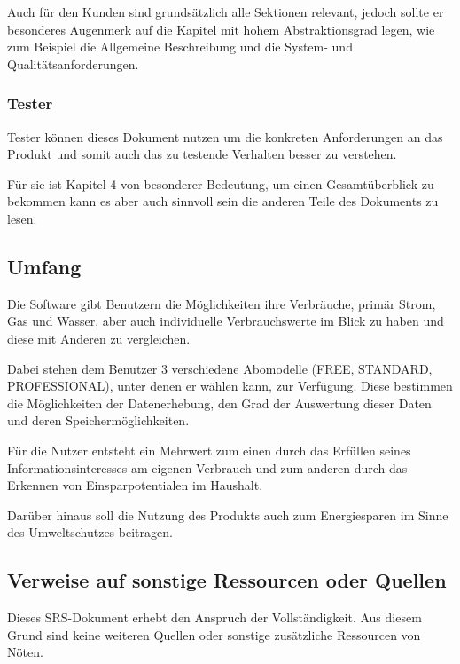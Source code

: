Auch für den Kunden sind grundsätzlich alle Sektionen relevant, jedoch sollte er besonderes Augenmerk auf die Kapitel mit hohem Abstraktionsgrad legen, wie zum Beispiel die Allgemeine Beschreibung und die System- und Qualitätsanforderungen.

\subsubsection{Tester}

Tester können dieses Dokument nutzen um die konkreten Anforderungen an das Produkt und somit auch das zu testende Verhalten besser zu verstehen. 

Für sie ist Kapitel 4 von besonderer Bedeutung, um einen Gesamtüberblick zu bekommen kann es aber auch sinnvoll sein die anderen Teile des Dokuments zu lesen.%

\subsection{Umfang}

Die Software gibt Benutzern die Möglichkeiten ihre Verbräuche, primär Strom, Gas und Wasser, aber auch individuelle Verbrauchswerte im Blick zu haben und diese mit Anderen zu vergleichen.

Dabei stehen dem Benutzer 3 verschiedene Abomodelle (FREE, STANDARD, PROFESSIONAL), unter denen er wählen kann, zur Verfügung. Diese bestimmen die Möglichkeiten der Datenerhebung, den Grad der Auswertung dieser Daten und deren Speichermöglichkeiten.

Für die Nutzer entsteht ein Mehrwert zum einen durch das Erfüllen seines Informationsinteresses am eigenen Verbrauch und zum anderen durch das Erkennen von Einsparpotentialen im Haushalt.

Darüber hinaus soll die Nutzung des Produkts auch zum Energiesparen im Sinne des Umweltschutzes beitragen.

\subsection{Verweise auf sonstige Ressourcen oder Quellen}

Dieses SRS-Dokument erhebt den Anspruch der Vollständigkeit. Aus diesem Grund sind keine weiteren Quellen oder sonstige zusätzliche Ressourcen von Nöten.
